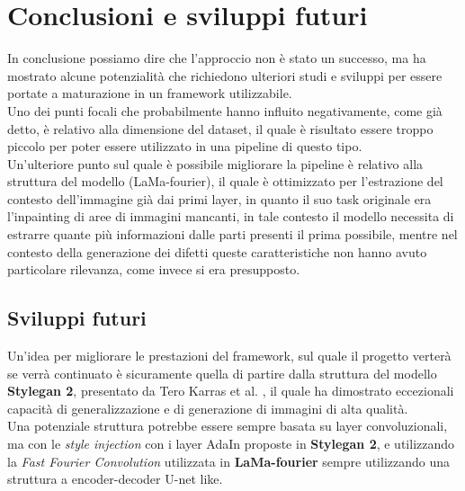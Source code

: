 \chapter{Conclusioni e sviluppi futuri}
In conclusione possiamo dire che l'approccio non è stato un successo, ma ha mostrato alcune potenzialità che richiedono ulteriori studi e sviluppi per
essere portate a maturazione in un framework utilizzabile.\\
Uno dei punti focali che probabilmente hanno influito negativamente, come già detto, è relativo alla dimensione del dataset, il quale è risultato essere
troppo piccolo per poter essere utilizzato in una pipeline di questo tipo.\\
Un'ulteriore punto sul quale è possibile migliorare la pipeline è relativo alla struttura del modello (LaMa-fourier), il quale è ottimizzato per l'estrazione
del contesto dell'immagine già dai primi layer, in quanto il suo task originale era l'inpainting di aree di immagini mancanti, in tale contesto il modello
necessita di estrarre quante più informazioni dalle parti presenti il prima possibile, mentre nel contesto
della generazione dei difetti queste caratteristiche non hanno avuto particolare rilevanza, come invece si era presupposto.

\section{Sviluppi futuri}
Un'idea per migliorare le prestazioni del framework, sul quale il progetto verterà se verrà continuato è sicuramente quella di partire dalla struttura del
modello \textbf{Stylegan 2}, presentato da Tero Karras et al. \cite{karras2020analyzing}, il quale ha dimostrato eccezionali capacità di generalizzazione
e di generazione di immagini di alta qualità.\\
Una potenziale struttura potrebbe essere sempre basata su layer convoluzionali, ma con le \textit{style injection} con i layer AdaIn proposte in \textbf{Stylegan 2},
e utilizzando la \textit{Fast Fourier Convolution} utilizzata in \textbf{LaMa-fourier} sempre utilizzando una struttura a encoder-decoder U-net like.
